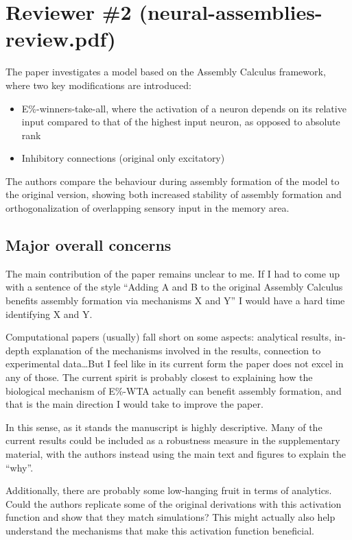 \documentclass[a4paper, 11pt]{article}
\begin{document}
\section*{Reviewer \#2 (neural-assemblies-review.pdf)}

The paper investigates a model based on the Assembly Calculus framework, where two key modifications are introduced:
\begin{itemize}
    \item E\%-winners-take-all, where the activation of a neuron depends on its relative input compared to that of the highest input neuron, as opposed to absolute rank
    \item Inhibitory connections (original only excitatory)
\end{itemize}

The authors compare the behaviour during assembly formation of the model to the original version, showing both increased stability of assembly formation and orthogonalization of overlapping sensory input in the memory area.

\subsection*{Major overall concerns}

The main contribution of the paper remains unclear to me. If I had to come up with a sentence of the style ``Adding A and B to the original Assembly Calculus benefits assembly formation via mechanisms X and Y'' I would have a hard time identifying X and Y.

Computational papers (usually) fall short on some aspects: analytical results, in-depth explanation of the mechanisms involved in the results, connection to experimental data\dots But I feel like in its current form the paper does not excel in any of those. The current spirit is probably closest to explaining how the biological mechanism of E\%-WTA actually can benefit assembly formation, and that is the main direction I would take to improve the paper.

In this sense, as it stands the manuscript is highly descriptive. Many of the current results could be included as a robustness measure in the supplementary material, with the authors instead using the main text and figures to explain the ``why''.

Additionally, there are probably some low-hanging fruit in terms of analytics. Could the authors replicate some of the original derivations with this activation function and show that they match simulations? This might actually also help understand the mechanisms that make this activation function beneficial.
\end{document}
